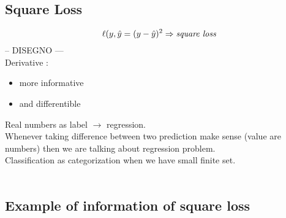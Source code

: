 \documentclass[../main.tex]{subfiles}
\begin{document}
\subsection{Square Loss}
$$ \ell(y,\hat{y} = ( y - \hat{y} )^2  \Rightarrow \textit{square loss}\\$$
-- DISEGNO ---\\
Derivative :
\begin{itemize}
\item more informative
\item and differentible 
\end{itemize}
Real numbers as label $\rightarrow$ regression.\\
Whenever taking difference between two prediction make sense (value are numbers) then we are talking about regression problem.\\
Classification as categorization when we have small finite set.\\\\

\subsection{Example of information of square loss}
\end{document}
